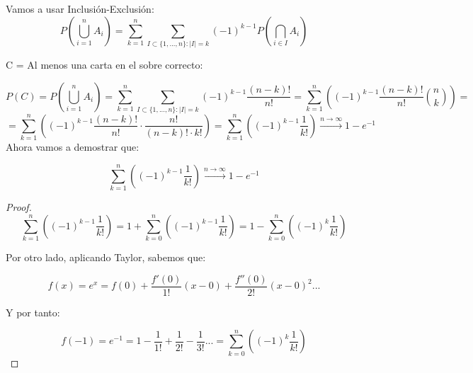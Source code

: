 \begin{problem}[11]
Vamos a usar Inclusión-Exclusión:
\[
P(\bigcup_{i=1}^nA_i)=\sum_{k=1}^{n}\sum_{I\subset \{1,...,n\}:|I|=k}(-1)^{k-1}P(\bigcap_{i\in I}A_i)
\]

C = Al menos una carta en el sobre correcto: 

\[
P(C)=P(\bigcup_{i=1}^nA_i)=\sum_{k=1}^{n}\sum_{I\subset \{1,...,n\}:|I|=k}(-1)^{k-1}\frac{(n-k)!}{n!}=\sum_{k=1}^{n}\left( (-1)^{k-1}\frac{(n-k)!}{n!}\binom{n}{k}\right)=
\]
\[
= \sum_{k=1}^{n}\left( (-1)^{k-1}\frac{(n-k)!}{n!}\cdot \frac{n!}{(n-k)!\cdot k!}\right)= \sum_{k=1}^{n}\left( (-1)^{k-1}\frac{1}{k!}\right) \stackrel{n \rightarrow \infty}{\rightarrow} 1-e^{-1}
\]
Ahora vamos a demostrar que:

\[
\sum_{k=1}^{n}\left( (-1)^{k-1}\frac{1}{k!}\right) \stackrel{n \rightarrow \infty}{\rightarrow} 1-e^{-1}
\]

\begin{proof}
\[
\sum_{k=1}^{n}\left( (-1)^{k-1}\frac{1}{k!}\right) = 1 + \sum_{k=0}^{n}\left((-1)^{k-1}\frac{1}{k!}\right) = 1 - \sum_{k=0}^{n}\left((-1)^{k}\frac{1}{k!}\right)
\]

Por otro lado, aplicando Taylor, sabemos que:

\[
f(x)=e^x=f(0)+\frac{f'(0)}{1!}(x-0)+\frac{f''(0)}{2!}(x-0)^2...
\]

Y por tanto:

\[
f(-1)=e^{-1}=1-\frac{1}{1!}+\frac{1}{2!}-\frac{1}{3!}... = \sum_{k=0}^{n}\left((-1)^{k}\frac{1}{k!}\right)
\]
\end{proof}



\end{problem}


